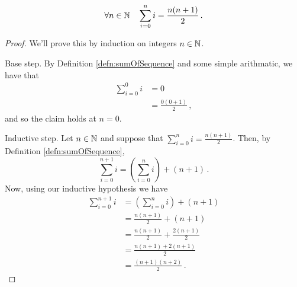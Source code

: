 \guard



\begin{prop}
\label{prop:sumOfConsequtiveIntegers}
  \[\forall n\in\mathbb{N}\quad\sum_{i=0}^n i = \frac{n(n+1)}{2}\,.\]
\end{prop}
\begin{proof}
  We'll prove this by induction on integers $n\in\mathbb{N}$.

  Base step.
  By Definition \ref{defn:sumOfSequence} and some simple arithmatic, we have that
    \begin{align*}
      \sum_{i=0}^0 i  &= 0 \\
                      &= \frac{ 0(0+1)}{2}\,,
    \end{align*}
  and so the claim holds at $n=0$.

  Inductive step. Let $n\in\mathbb{N}$ and suppose that $\sum_{i=0}^n i = \frac{n(n+1)}{2}$.
  Then, by Definition \ref{defn:sumOfSequence},
    \[ \sum_{i=0}^{n+1} i = \left( \sum_{i=0}^{n} i \right) + (n+1)\,. \]
  Now, using our inductive hypothesis we have
    \begin{align*}
      \sum_{i=0}^{n+1} i &= \left( \sum_{i=0}^{n} i \right) + (n+1) \\
                         &= \frac{ n(n+1)}{2} + (n+1) \\
                         &= \frac{ n(n+1)}{2} + \frac{2(n+1)}{2} \\
                         &= \frac{ n(n+1)+2(n+1)}{2} \\
                         &= \frac{ (n+1)(n+2) }{2} \,.
    \end{align*}
\end{proof}
